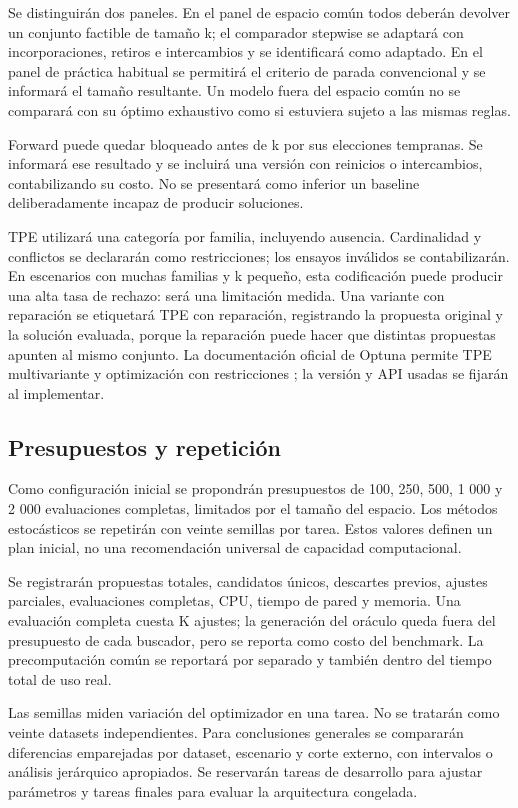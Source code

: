 \documentclass[11pt,letterpaper]{article}
\begin{document}
Se distinguirán dos paneles. En el panel de espacio común todos deberán devolver un conjunto factible de tamaño k; el comparador stepwise se adaptará con incorporaciones, retiros e intercambios y se identificará como adaptado. En el panel de práctica habitual se permitirá el criterio de parada convencional y se informará el tamaño resultante. Un modelo fuera del espacio común no se comparará con su óptimo exhaustivo como si estuviera sujeto a las mismas reglas.

Forward puede quedar bloqueado antes de k por sus elecciones tempranas. Se informará ese resultado y se incluirá una versión con reinicios o intercambios, contabilizando su costo. No se presentará como inferior un baseline deliberadamente incapaz de producir soluciones.

TPE utilizará una categoría por familia, incluyendo ausencia. Cardinalidad y conflictos se declararán como restricciones; los ensayos inválidos se contabilizarán. En escenarios con muchas familias y k pequeño, esta codificación puede producir una alta tasa de rechazo: será una limitación medida. Una variante con reparación se etiquetará TPE con reparación, registrando la propuesta original y la solución evaluada, porque la reparación puede hacer que distintas propuestas apunten al mismo conjunto. La documentación oficial de Optuna permite TPE multivariante y optimización con restricciones \cite{ref10}; la versión y API usadas se fijarán al implementar.

\subsection{Presupuestos y repetición}\label{sec:10.5}

Como configuración inicial se propondrán presupuestos de 100, 250, 500, 1 000 y 2 000 evaluaciones completas, limitados por el tamaño del espacio. Los métodos estocásticos se repetirán con veinte semillas por tarea. Estos valores definen un plan inicial, no una recomendación universal de capacidad computacional.

Se registrarán propuestas totales, candidatos únicos, descartes previos, ajustes parciales, evaluaciones completas, CPU, tiempo de pared y memoria. Una evaluación completa cuesta K ajustes; la generación del oráculo queda fuera del presupuesto de cada buscador, pero se reporta como costo del benchmark. La precomputación común se reportará por separado y también dentro del tiempo total de uso real.

Las semillas miden variación del optimizador en una tarea. No se tratarán como veinte datasets independientes. Para conclusiones generales se compararán diferencias emparejadas por dataset, escenario y corte externo, con intervalos o análisis jerárquico apropiados. Se reservarán tareas de desarrollo para ajustar parámetros y tareas finales para evaluar la arquitectura congelada.
\end{document}
